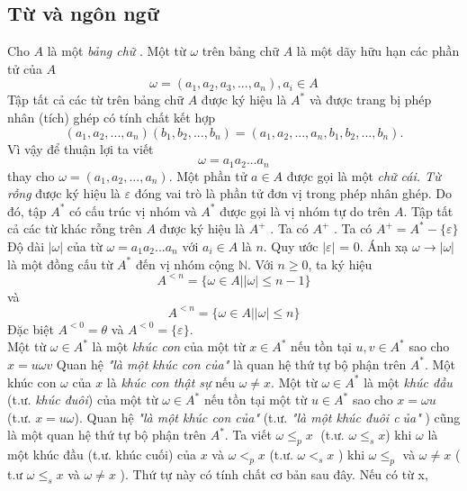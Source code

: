 \begin{flushleft}
    \section{Từ và ngôn ngữ}
\end{flushleft}
\begin{flushleft}
Cho $A$ là một \textit{bảng chữ} . Một từ $\omega$ trên bảng chữ $A$ là một dãy hữu hạn các phần tử của $A$
$$
    \omega = (a_1, a_2, a_3, ... , a_n), a_i \in A
$$
\hspace{10mm}Tập tất cả các từ trên bảng chữ $A$ được ký hiệu là $A^*$ và được trang bị phép nhân (tích) ghép có tính chất kết hợp 
$$
(a_1, a_2, ... , a_n)(b_1, b_2, ... , b_n) = (a_1, a_2, ... , a_n,b_1, b_2, ... , b_n).
$$
Vì vậy để thuận lợi ta viết 
$$
    \omega = a_1a_2...a_n
$$
thay cho $\omega = ( a_1, a_2, ... , a_n )$. Một phần tử $a \in A$ được gọi là một \textit{chữ cái. Từ rỗng} được ký hiệu là $\varepsilon$ đóng vai trò là phần tử đơn vị trong phép nhân ghép. Do đó, tập $A^*$ có cấu trúc vị nhóm và $A^*$ được gọi là vị nhóm tự do trên $A$. Tập tất cả các từ khác rỗng trên $A$ được ký hiệu là $A^+$ . Ta có $A^+$ . Ta có $A^+ = A^* - \{{\varepsilon}\}$ 
\hspace{10mm}Độ dài $|\omega|$ của từ $\omega = a_1a_2...a_n$ với $a_i \in A$ là $n.$ Quy ước $|\varepsilon|$ = 0. Ánh xạ $\omega \to |\omega|$ là một đồng cấu từ $A^*$ đến vị nhóm cộng $\mathbb{N}$. Với $n \ge 0$, ta ký hiệu 
$$
    A^{<n} = \{ \omega \in A | |\omega| \le n - 1 \}
$$
và 
$$
    A^{<n} = \{ \omega \in A | |\omega| \le n \}
$$
Đặc biệt $A^{<0} = \theta $ và $A^{<0} = \{ \varepsilon \}$. \\
\hspace{10mm}Một từ $\omega \in A^*$ là một \textit{khúc con} của một từ $ x \in A^*$ nếu tồn tại $u, v \in A^*$ sao cho $x = u\omega v$ Quan hệ \textit{"là một khúc con của"} là quan hệ thứ tự bộ phận trên $A^*$. Một khúc con $\omega$ của $x$ là \textit{khúc con thật sự} nếu $\omega \ne x$. Một từ $\omega \in A^*$ là một \textit{khúc đầu} (t.ư. \textit{khúc đuôi}) của một từ $\omega \in A^*$ nếu tồn tại một từ $u \in A^*$ sao cho $x = \omega u$ (t.ư. $x = u\omega$). Quan hệ \textit{"là một khúc con của"} (t.ư. \textit{"là một khúc đuôi của"} ) cũng là một quan hệ thứ tự bộ phận trên $A^*$. Ta viết $\omega \le_p x$ (t.ư. $\omega \le_s x$) khi $\omega$ là một khúc đầu (t.ư. khúc cuối) của $x$ và $\omega <_p x$ (t.ư. $\omega <_{s} x$ ) khi $\omega \le_{p}$ và $\omega \ne x$ ( t.ư $\omega \le_s x$ và $\omega \ne x$ ). Thứ tự này có tính chất cơ bản sau đây. Nếu có từ x,

\end{flushleft}
